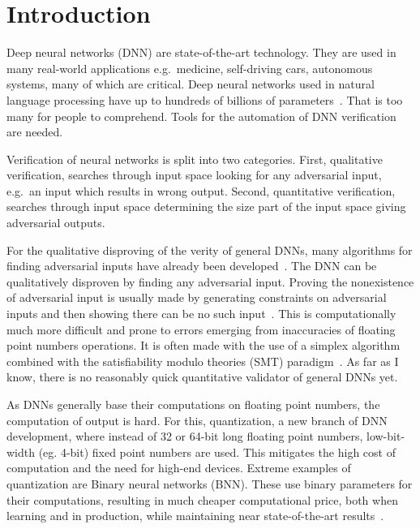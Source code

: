 \documentclass{fithesis}
\begin{document}
\chapter{Introduction}


Deep neural networks (DNN) are state-of-the-art technology. They are used in many
real-world applications e.g.\ medicine, self-driving cars, autonomous systems,
many of which are critical. %
Deep neural networks used in natural language processing have up to hundreds of
billions of parameters~\cite{2021arXiv210901652W}.
That is too many for people to comprehend. Tools for the automation
of DNN verification are needed.

Verification of neural networks is split into two categories. First,
qualitative verification, searches through input space looking for any
adversarial input, e.g.\ an input which results in wrong output.
Second, quantitative verification, searches through input space
determining the size part of the input space giving adversarial outputs.

For the qualitative disproving of the verity of general DNNs,
many algorithms for finding adversarial
inputs have already been developed~\cite{7958570, chen2020real, 8578273}.
The DNN can be qualitatively disproven by finding any adversarial input.
Proving the nonexistence of adversarial input is usually made by generating constraints
on adversarial inputs and then showing there can be no such
input~\cite{Isac2022NeuralNV}. This is computationally much more difficult
and prone to errors emerging from inaccuracies of floating point numbers operations.
It is often made with the use of a simplex algorithm combined with 
the satisfiability modulo theories (SMT) paradigm~\cite{Isac2022NeuralNV, marabou2019, reluplex2017}.
As far as I know, there is no reasonably quick quantitative
validator of general DNNs yet.

As DNNs generally base their computations on floating point numbers,
the computation of output is hard. For this, quantization,
a new branch of DNN development, where instead of 32 or 64-bit long floating
point numbers, low-bit-width (eg. 4-bit) fixed point numbers are used.
This mitigates the high cost of computation and the need for high-end devices.
Extreme examples of quantization are Binary neural networks (BNN).
These use binary parameters for their computations, resulting in much
cheaper computational price, both when learning and in production,
while maintaining near state-of-the-art results~\cite{Agrawal2023}.
\end{document}
